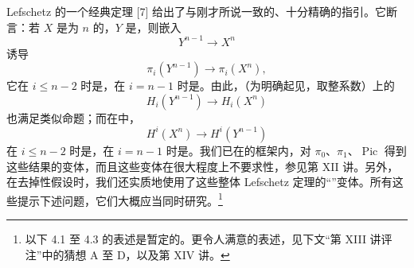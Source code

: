 Lefschetz 的一个经典定理 [7] 给出了与刚才所说一致的、十分精确的指引。它断言：若 $X$ 是为 $n$ 的，$Y$ 是，则嵌入
\[
Y^{n-1}\longrightarrow X^n
\]
诱导
\[
\pi_i(Y^{n-1})\longrightarrow\pi_i(X^n),
\]
它在 $i\leq n-2$ 时是，在 $i=n-1$ 时是。由此，（为明确起见，取整系数）上的
\[
H_i(Y^{n-1})\longrightarrow H_i(X^n)
\]
也满足类似命题；而在中，
\[
H^i(X^n)\longrightarrow H^i(Y^{n-1})
\]
在 $i\leq n-2$ 时是，在 $i=n-1$ 时是。我们已在的框架内，对 $\pi_0$、$\pi_1$、$\operatorname{Pic}$ 得到这些结果的变体，而且这些变体在很大程度上不要求性，参见第 XII 讲。另外，在去掉性假设时，我们还实质地使用了这些整体 Lefschetz 定理的“”变体。所有这些提示下述问题，它们大概应当同时研究。\footnote{以下 4.1 至 4.3 的表述是暂定的。更令人满意的表述，见下文“第 XIII 讲评注”中的猜想 A 至 D，以及第 XIV 讲。}

